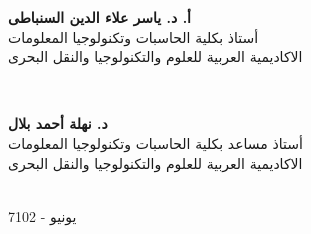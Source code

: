 \documentclass{llncs}
\begin{document}
\begin{titlepage}
\begin{minipage}{0.45\textwidth}
\begin{flushleft}
{\large \bfseries 
أ. د. ياسر علاء الدين السنباطى
}\\
{
أستاذ بكلية الحاسبات وتكنولوجيا المعلومات
}\\
{
الاكاديمية العربية للعلوم والتكنولوجيا والنقل البحرى
}
\end{flushleft}
\end{minipage}
~
\begin{minipage}{0.47\textwidth}
\begin{flushright}
\center
{\large \bfseries 
د. نهلة أحمد بلال
}\\
{
أستاذ مساعد بكلية الحاسبات وتكنولوجيا المعلومات
}\\
{
الاكاديمية العربية للعلوم والتكنولوجيا والنقل البحرى
}
\end{flushright}
\end{minipage}\\[1cm]
{
يونيو - 7102
}\\[0.2cm] 
\vfill %
\end{titlepage}


\end{document}
